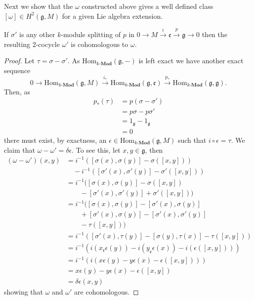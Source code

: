 Next we show that the $ \omega $ constructed above gives a well defined class $ [\omega] \in H^{2}(\mathfrak{g}, M) $ for a given Lie algebra extension.
\begin{lemma}
  If $ \sigma' $ is any other $ k $-module splitting of $ p $ in $ 0 \to M \xrightarrow{i} \mathfrak{e} \xrightarrow{p} \mathfrak{g} \to 0 $ then the resulting 2-cocycle $ \omega' $ is cohomologous to $ \omega $.
\end{lemma}
\begin{proof}
  Let $ \tau = \sigma - \sigma' $. As $ \text{Hom}_{k\text{-}\mathbf{Mod}}(\mathfrak{g}, -) $ is left exact we have another exact sequence
  \begin{equation}
    0 \to  \text{Hom}_{k\text{-}\mathbf{Mod}}(\mathfrak{g}, M) \xrightarrow{i_{*}}  \text{Hom}_{k\text{-}\mathbf{Mod}}(\mathfrak{g}, \mathfrak{e}) \xrightarrow{p_*}  \text{Hom}_{k\text{-}\mathbf{Mod}}(\mathfrak{g}, \mathfrak{g}).
  \end{equation}
  Then, as
  \begin{align*}
    p_*(\tau) &= p(\sigma - \sigma') \\
              &= p \sigma - p \sigma' \\
              &= 1_\mathfrak{g} - 1_\mathfrak{g} \\
              &= 0
  \end{align*}
  there must exist, by exactness, an $ \epsilon \in  \text{Hom}_{k\text{-}\mathbf{Mod}}(\mathfrak{g}, M)  $ such that $ i \circ \epsilon = \tau $. We claim that $ \omega - \omega' = \delta\epsilon $. To see this, let $ x,y \in \mathfrak{g} $, then
  \begin{align*}
    (\omega - \omega')(x,y) &= i^{-1}([\sigma(x), \sigma(y)] - \sigma([x,y])) \\
                            &\quad - i^{-1}([\sigma'(x), \sigma'(y)] - \sigma'([x,y])) \\
                            &= i^{-1}([\sigma(x), \sigma(y)] - \sigma([x,y]) \\
                            &\quad\quad -[\sigma'(x), \sigma'(y)] + \sigma'([x,y])) \\
                            &= i^{-1}([\sigma(x), \sigma(y)] - [\sigma'(x), \sigma(y)] \\
                            &\quad\quad +[\sigma'(x), \sigma(y)] - [\sigma'(x), \sigma'(y)] \\
                            &\quad\quad - \tau([x,y])) \\
                            &= i^{-1}([\sigma'(x), \tau(y)] - [\sigma(y), \tau(x)]- \tau([x,y])) \\
                            &= i^{-1}(i(x_\mathfrak{e}\epsilon(y)) - i(y_{\mathfrak{e}}\epsilon(x)) - i(\epsilon([x,y]))) \\
                            &= i^{-1}(i(x\epsilon(y) - y\epsilon(x) - \epsilon([x,y]))) \\
                            &= x\epsilon(y) - y\epsilon(x) - \epsilon([x,y]) \\
                            &= \delta\epsilon(x,y)
  \end{align*}
  showing that $ \omega $ and $ \omega' $ are cohomologous.
\end{proof}
